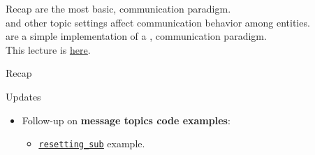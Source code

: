 
\begin{frame}{Recap}
 are the most basic,  communication paradigm.\\
\bigskip
{} and other topic settings affect communication behavior among entities.\\
\bigskip
{} are a simple implementation of a ,  communication paradigm.\\
\bigskip
This lecture is \href{https://github.com/robmasocco/DAFN24_Robotics_4}{\color{blue}\underline{here}}.
\end{frame}
\begin{frame}{Recap}
  \begin{block}{Updates}
    \begin{itemize}
      \item Follow-up on \textbf{message topics code examples}:
      \begin{itemize}
        \item \href{https://github.com/IntelligentSystemsLabUTV/ros2-examples/blob/humble/src/cpp/topic_pubsub_cpp/src/resetting_sub.cpp}{\color{blue}\underline{\texttt{resetting\_sub}}} example.
      \end{itemize}
    \end{itemize}
  \end{block}
\end{frame}
